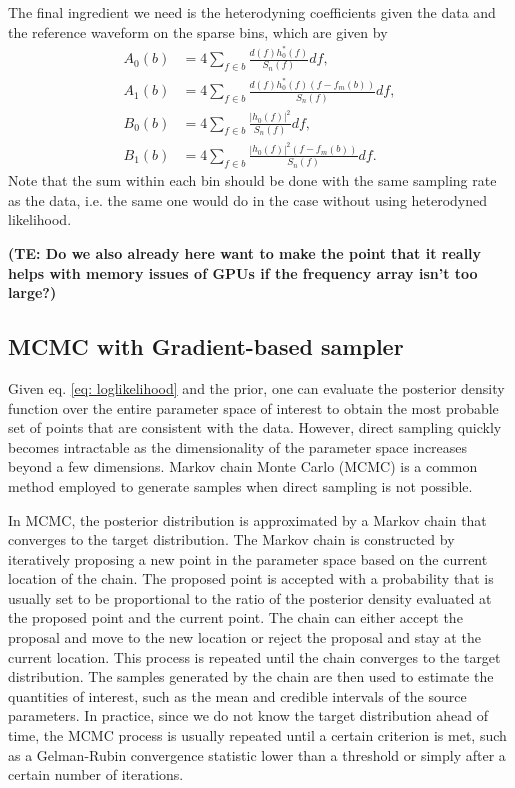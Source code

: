 \documentclass[twocolumn]{aastex631}
\newcommand{\te}[1]{\textbf{\color{pyRed}(TE: #1)}}
\begin{document}
The final ingredient we need is the heterodyning coefficients given the data and
the reference waveform on the sparse bins, which are given by
\begin{align}
    A_0(b) &= 4 \sum_{f \in b} \frac{d(f)h^*_0(f)}{S_n(f)} df, \\
    A_1(b) &= 4 \sum_{f \in b} \frac{d(f)h^*_0(f)(f-f_m(b))}{S_n(f)} df, \\
    B_0(b) &= 4 \sum_{f \in b} \frac{|h_0(f)|^2}{S_n(f)} df, \\
    B_1(b) &= 4 \sum_{f \in b} \frac{|h_0(f)|^2(f-f_m(b))}{S_n(f)} df.
\end{align}
Note that the sum within each bin should be done with the same sampling rate as
the data, i.e. the same one would do in the case without using heterodyned
likelihood.

\te{Do we also already here want to make the point that it really helps with memory issues of GPUs if the frequency array isn't too large?}

\subsection{MCMC with Gradient-based sampler}
\label{sec:gradient}

Given eq. \ref{eq: loglikelihood} and the prior, one can evaluate the posterior
density function over the entire parameter space of interest to obtain the most
probable set of points that are consistent with the data. However, direct
sampling quickly becomes intractable as the dimensionality of the parameter
space increases beyond a few dimensions. Markov chain Monte Carlo (MCMC) is a
common method employed to generate samples when direct sampling is not possible.

In MCMC, the posterior distribution is approximated by a Markov chain that
converges to the target distribution. The Markov chain is constructed by
iteratively proposing a new point in the parameter space based on the current
location of the chain. The proposed point is accepted with a probability that is
usually set to be proportional to the ratio of the posterior density evaluated
at the proposed point and the current point. The chain can either accept the
proposal and move to the new location or reject the proposal and stay at the
current location. This process is repeated until the chain converges to the
target distribution. The samples generated by the chain are then used to
estimate the quantities of interest, such as the mean and credible intervals of
the source parameters. In practice, since we do not know the target distribution
ahead of time, the MCMC process is usually repeated until a certain criterion is
met, such as a Gelman-Rubin convergence statistic \cite{Gelman-rhat} lower than
a threshold or simply after a certain number of iterations.
\end{document}
